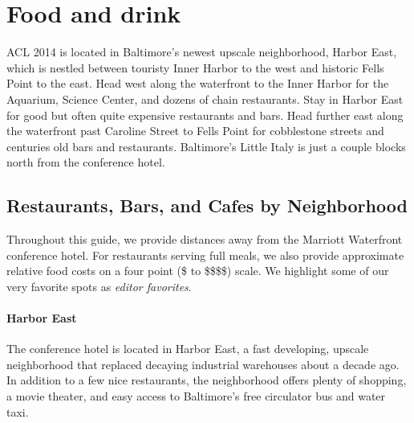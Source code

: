\section{Food and drink}
\label{restaurant-guide}
\thispagestyle{emptyheader}

ACL 2014 is located in Baltimore's newest upscale neighborhood, Harbor
East, which is nestled between touristy Inner Harbor to the west and
historic Fells Point to the east. Head west along the waterfront to
the Inner Harbor for the Aquarium, Science Center, and dozens of chain
restaurants. Stay in Harbor East for good but often quite expensive
restaurants and bars. Head further east along the waterfront past
Caroline Street to Fells Point for cobblestone streets and centuries
old bars and restaurants. Baltimore's Little Italy is just a couple
blocks north from the conference hotel.

\newcommand{\gradstudent}{\$\xspace}
\newcommand{\postdoc}{\$\$\xspace}
\newcommand{\professor}{\$\$\$\xspace}
\newcommand{\industry}{\$\$\$\$\xspace}

\newenvironment{restaurant}[6]{
  \item[#6]{#1 (#2, #3 miles away) #4 #5.}
}{}

\subsection*{Restaurants, Bars, and Cafes by Neighborhood}

Throughout this guide, we provide distances away from the Marriott
Waterfront conference hotel. For restaurants serving full meals, we
also provide approximate relative food costs on a four point (\gradstudent to
\industry) scale. We highlight some of our very favorite spots as {\it
  editor favorites}.

\paragraph*{Harbor East}
The conference hotel is located in Harbor East, a fast developing, upscale neighborhood that replaced decaying industrial warehouses about a decade ago. In addition to a few nice restaurants, the neighborhood offers plenty of shopping, a movie theater, and easy access to Baltimore's free circulator bus and water taxi. 


